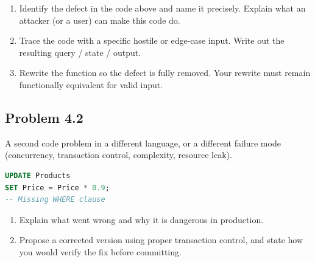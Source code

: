 \begin{enumerate}[label=(\alph*)]

\item Identify the defect in the code above and name it precisely.
Explain what an attacker (or a user) can make this code do.

\vspace{35mm}

\item Trace the code with a specific hostile or edge-case input.
Write out the resulting query / state / output.

\vspace{40mm}

\item Rewrite the function so the defect is fully removed.
Your rewrite must remain functionally equivalent for valid input.

\vspace{60mm}

\end{enumerate}


\newpage
\subsection*{Problem 4.2}

A second code problem in a different language, or a different failure mode
(concurrency, transaction control, complexity, resource leak).

\begin{lstlisting}[language=SQL]
UPDATE Products
SET Price = Price * 0.9;
-- Missing WHERE clause
\end{lstlisting}

\begin{enumerate}[label=(\alph*)]

\item Explain what went wrong and why it is dangerous in production.

\vspace{35mm}

\item Propose a corrected version using proper transaction control,
and state how you would verify the fix before committing.

\vspace{50mm}

\end{enumerate}
